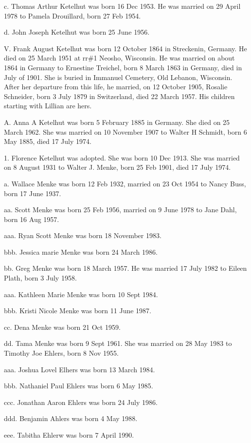 \documentclass[a4paper]{article}
\begin{document}
c. Thomas Arthur Ketelhut was born 16 Dec 1953.  He was married on 29 April 1978 to Pamela Drouillard, born 27 Feb 1954.

d. John Joseph Ketelhut was born 25 June 1956.

V. Frank August Ketelhut was born 12 October 1864 in Streckenin, Germany.  He died on 25 March 1951 at rr\#1 Neosho, Wisconsin.  He was married on about 1864 in Germany to Ernestine Treichel, born 8 March 1863 in Germany, died in July of 1901.  She is buried in Immanuel Cemetery,  Old Lebanon, Wisconsin.  After her departure from this life, he married, on 12 October 1905, Rosalie Schneider, born 3 July 1879 in Switzerland, died 22 March 1957.  His children starting with Lillian are hers.

A. Anna A Ketelhut was born 5 February 1885 in Germany.  She died on 25 March 1962. She was married on 10 November 1907 to Walter H Schmidt, born 6 May 1885, died 17 July 1974.

1. Florence Ketelhut was adopted.  She was born 10 Dec 1913.  She was married on 8 August 1931 to Walter J. Menke, born 25 Feb 1901, died 17 July 1974.

a. Wallace Menke was born 12 Feb 1932, married on 23 Oct 1954 to Nancy Buss, born 17 June 1937.

aa. Scott Menke was born 25 Feb 1956, married on 9 June 1978 to Jane Dahl, born 16 Aug 1957.

aaa. Ryan Scott Menke was born 18 November 1983.

bbb. Jessica marie Menke was born 24 March 1986.

bb. Greg Menke was born 18 March 1957.  He was married 17 July 1982 to Eileen Plath, born 3 July 1958.

aaa. Kathleen Marie Menke was born 10 Sept 1984.

bbb. Kristi Nicole Menke was born 11 June 1987.

cc. Dena Menke was born 21 Oct 1959.

dd. Tama Menke was born 9 Sept 1961.  She was married on 28 May 1983 to Timothy Joe Ehlers, born 8 Nov 1955.

aaa. Joshua Lovel Elhers was born 13 March 1984.

bbb. Nathaniel Paul Ehlers was born 6 May 1985.

ccc. Jonathan Aaron Ehlers was born 24 July 1986.

ddd. Benjamin Ahlers was born 4 May 1988.

eee. Tabitha Ehlerw was born 7 April 1990.
\end{document}
